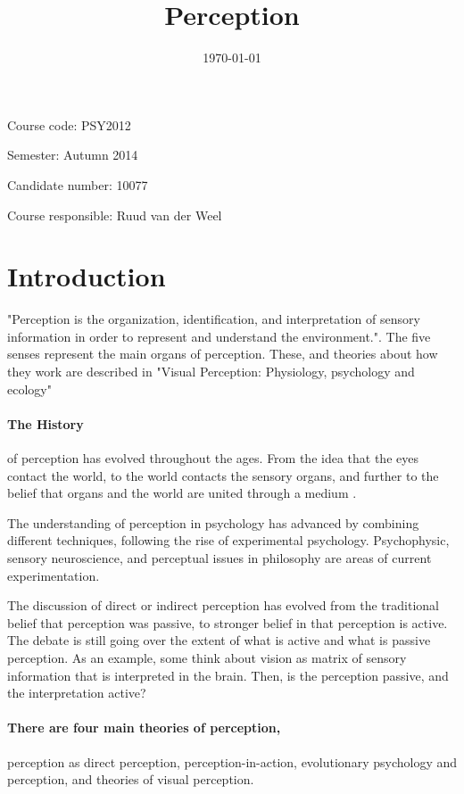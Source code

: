 \documentclass[12pt, a4paper]{article}
\title{
	Perception 
}
\author{
}
\date{\today}
\begin{document}
\onehalfspace
\maketitle
{}

Course code: PSY2012

Semester: Autumn 2014

Candidate number: 10077 

Course responsible: Ruud van der Weel


\tableofcontents
\newpage 

\section{Introduction}

"Perception is the organization, identification, and interpretation of sensory information in
order to represent and understand the environment."\cite{wiki}. 
The five senses represent the main organs of perception. These, and theories
about how they work are described in "Visual Perception: Physiology, psychology
and ecology"\cite{visualbook}

\paragraph{The History}
of perception has evolved throughout the ages. From the idea that the eyes
contact the world, to the world contacts the sensory organs, and further to the
belief that organs and the world are united through a medium \cite{lecture}.

The understanding of perception in psychology has advanced by combining
different techniques, following the rise of experimental psychology.  
Psychophysic, sensory neuroscience, and perceptual issues in philosophy are
areas of current experimentation.   

The discussion of direct or indirect perception has evolved from the
traditional belief that perception was passive, to stronger belief in that
perception is active. The debate is still going over the extent of what is
active and what is passive perception. As an example, some think about vision
as matrix of sensory information that is interpreted in the brain. Then, is the
perception passive, and the interpretation active?    

\paragraph{There are four main theories of perception,} perception as direct
perception, perception-in-action, evolutionary psychology and perception, and theories 
of visual perception. 
\end{document}
